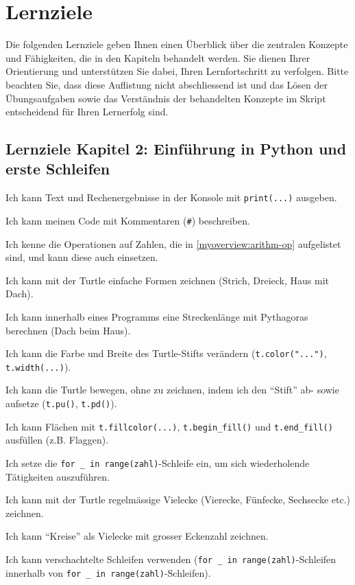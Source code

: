 \chapter*{Lernziele}

Die folgenden Lernziele geben Ihnen einen Überblick über die zentralen Konzepte und Fähigkeiten, die in den Kapiteln behandelt werden. Sie dienen Ihrer Orientierung und unterstützen Sie dabei, Ihren Lernfortschritt zu verfolgen. Bitte beachten Sie, dass diese Auflistung nicht abschliessend ist und das Lösen der Übungsaufgaben sowie das Verständnis der behandelten Konzepte im Skript entscheidend für Ihren Lernerfolg sind.

\section*{Lernziele Kapitel 2: Einführung in Python und erste Schleifen}
\begin{todolist}
    \item Ich kann Text und Rechenergebnisse in der Konsole mit \lstinline|print(...)| ausgeben.
    \item Ich kann meinen Code mit Kommentaren (\lstinline|#|) beschreiben.
    \item Ich kenne die Operationen auf Zahlen, die in \cref{myoverview:arithm-op} aufgelistet sind, und kann diese auch einsetzen.
    \item Ich kann mit der Turtle einfache Formen zeichnen (Strich, Dreieck, Haus mit Dach).
    \item Ich kann innerhalb eines Programms eine Streckenlänge mit Pythagoras berechnen (Dach beim Haus).
    \item Ich kann die Farbe und Breite des Turtle-Stifts verändern (\lstinline|t.color("...")|, \lstinline|t.width(...)|).
    \item Ich kann die Turtle bewegen, ohne zu zeichnen, indem ich den \enquote{Stift} ab- sowie aufsetze (\lstinline|t.pu()|, \lstinline|t.pd()|).
    \item Ich kann Flächen mit \lstinline|t.fillcolor(...)|, \lstinline|t.begin_fill()| und \lstinline|t.end_fill()| ausfüllen (z.B. Flaggen).
    \item Ich setze die \lstinline|for _ in range(zahl)|-Schleife ein, um sich wiederholende Tätigkeiten auszuführen.
    \item Ich kann mit der Turtle regelmässige Vielecke (Vierecke, Fünfecke, Sechsecke etc.) zeichnen.
    \item Ich kann \enquote{Kreise} als Vielecke mit grosser Eckenzahl zeichnen.
    \item Ich kann verschachtelte Schleifen verwenden (\lstinline|for _ in range(zahl)|-Schleifen innerhalb von \lstinline|for _ in range(zahl)|-Schleifen).
\end{todolist}
